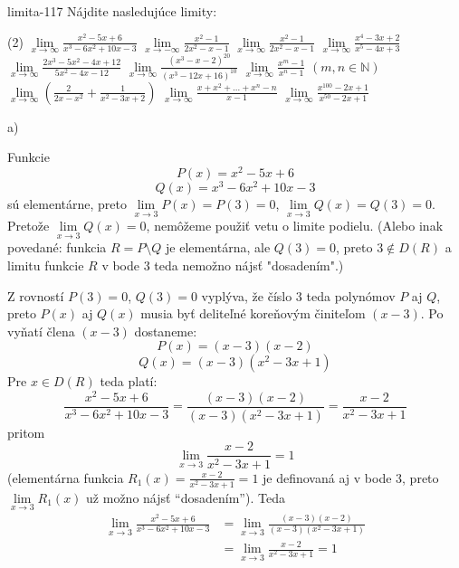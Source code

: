 \begin{defproblem}{limita-117}
Nájdite nasledujúce limity:

\begin{tasks}(2)
    \task $\lim\limits_{{x \to \infty}} \frac{x^2-5x+6}{x^3-6x^2+10x-3}$
    \task $\lim\limits_{{x \to -\infty}} \frac{x^2-1}{2x^2-x-1}$
    \task $\lim\limits_{{x \to \infty}} \frac{x^2-1}{2x^2-x-1}$
    \task $\lim\limits_{{x \to \infty}} \frac{x^4-3x+2}{x^5-4x+3}$
    \task $\lim\limits_{{x \to \infty}} \frac{2x^3-5x^2-4x+12}{5x^2-4x-12}$
    \task $\lim\limits_{{x \to \infty}} \frac{(x^3-x-2)^{20}}{(x^3-12x+16)^{10}}$
    \task $\lim\limits_{{x \to \infty}} \frac{x^m-1}{x^n-1}$ $(m,n \in \mathbb{N})$
    \task $\lim\limits_{{x \to \infty}} (\frac{2}{2x-x^2}+\frac{1}{x^2-3x+2})$
    \task $\lim\limits_{{x \to \infty}} \frac{x+x^2+...+x^n-n}{x-1}$
    \task $\lim\limits_{{x \to \infty}} \frac{x^{100}-2x+1}{x^{50}-2x+1}$
\end{tasks}
\begin{solution}
    a)

    Funkcie
    \[
        P(x) = x^2 - 5x + 6
    \]
    \[
        Q(x) = x^3 - 6x^2 + 10x - 3
    \]
    sú elementárne, preto $\lim\limits_{x \to 3} P(x) = P(3) = 0$, $\lim\limits_{x
    \to 3} Q(x) = Q(3) = 0$. Pretože $\lim\limits_{x \to 3} Q(x) = 0$,
    nemôžeme použiť vetu o limite podielu. (Alebo inak povedané: funkcia $R = P
    \setminus Q$ je elementárna, ale $Q(3) = 0$, preto $3 \notin D(R)$ a limitu
    funkcie $R$ v bode $3$ teda nemožno nájsť "dosadením".)

    Z rovností $P(3) = 0$, $Q(3) = 0$ vyplýva, že číslo $3$ teda polynómov $P$
    aj $Q$, preto $P(x)$ aj $Q(x)$ musia byť deliteľné koreňovým činiteľom $(x -
    3)$. Po vyňatí člena $(x - 3)$ dostaneme:
    \[
        P(x)=(x - 3)(x - 2)
    \]
    \[
        Q(x)=(x - 3)(x^2 - 3x + 1)
    \]
    Pre $x \in D(R)$ teda platí:
    \[
        \frac{x^2 - 5x + 6}{x^3 - 6x^2 + 10x - 3}
            = \frac{(x - 3)(x - 2)}{(x - 3)(x^2 - 3x + 1)}
            = \frac{x-2}{x^2-3x+1}
    \]
    pritom
    \[
        \lim\limits_{x \to 3} \frac{x - 2}{x^2 - 3x + 1}=1
    \]
    (elementárna funkcia $R_1(x) = \frac{x - 2}{x^2 - 3x + 1}=1$ je
    definovaná aj v bode $3$, preto $\lim\limits_{x \to 3} R_1(x)$ už možno
    nájsť ``dosadením''). Teda
    \begin{align*}
        \lim\limits_{x \to 3} \frac{x^2 - 5x + 6}{x^3 - 6x^2 + 10x - 3}
        &= \lim\limits_{x \to 3} \frac{(x - 3)(x - 2)}{(x - 3)(x^2 - 3x + 1)} \\
        &= \lim\limits_{x \to 3} \frac{x - 2}{x^2 - 3x + 1} = 1
    \end{align*}
\end{solution}
\end{defproblem}

